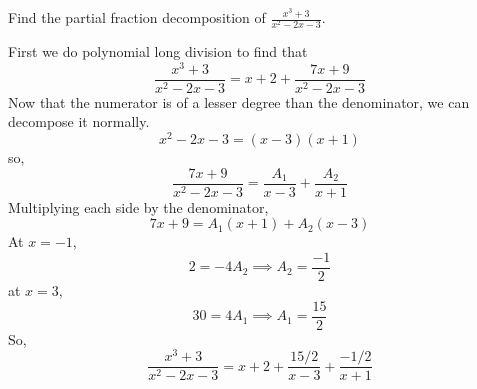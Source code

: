 \begin{example}
	Find the partial fraction decomposition of $\frac{x^3+3}{x^2-2x-3}$.
\end{example}
\noindent
First we do polynomial long division to find that
\begin{equation*}
	\frac{x^3+3}{x^2-2x-3} = x + 2 + \frac{7x+9}{x^2-2x-3}
\end{equation*}
Now that the numerator is of a lesser degree than the denominator, we can decompose it normally.
\begin{equation*}
	x^2-2x-3 = (x-3)(x+1)
\end{equation*}
so,
\begin{equation*}
	\frac{7x+9}{x^2-2x-3} = \frac{A_1}{x-3} + \frac{A_2}{x+1}
\end{equation*}
Multiplying each side by the denominator,
\begin{equation*}
	7x+9 = A_1(x+1) + A_2(x-3)
\end{equation*}
At $x=-1$,
\begin{equation*}
	2 = -4A_2 \implies A_2 = \frac{-1}{2}
\end{equation*}
at $x=3$,
\begin{equation*}
	30 = 4A_1 \implies A_1 = \frac{15}{2}
\end{equation*}
So,
\begin{equation*}
	\frac{x^3+3}{x^2-2x-3} = x + 2 + \frac{15/2}{x-3} + \frac{-1/2}{x+1}
\end{equation*}